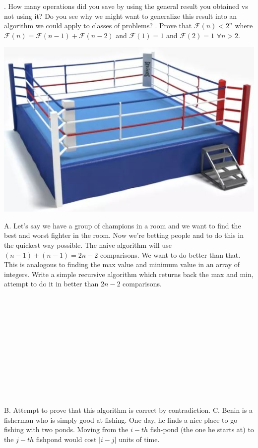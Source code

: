 \documentclass[12pt]{article}
\begin{document}
. How many operations did you save by using the general result you obtained vs not using it? Do you see why we might want to generalize this result into an algorithm we could apply to classes of problems?
\newpage
{}.  Prove that $\mathscr{F}(n) < 2^n$ where $\mathscr{F}(n) = \mathscr{F}(n-1) + \mathscr{F}(n-2)$ and $\mathscr{F}(1)=1$ and $\mathscr{F}(2) = 1$ $\forall n > 2$. 
\newpage
\centerline{\includegraphics[scale = 0.25]{boxing.jpg}}
\noindent A. Let's say we have a group of champions in a room and we want to find the best and worst fighter in the room. Now we're betting people and to do this in the quickest way possible. The naive algorithm will use $(n-1) + (n-1) = 2n -2 $ comparisons. We want to do better than that. This is analogous to finding the max value and minimum value in an array of integers. Write a simple recursive algorithm which returns back the max and min, attempt to do it in better than $2n-2$ comparisons.\\\\\\\\\\\\\\\\\\\\\\\\\\
\noindent B. Attempt to prove that this algorithm is correct by contradiction. 
\newpage
\noindent C. Benin is a fisherman who is simply good at fishing. One day, he finds a nice place to go fishing with two ponds. 
Moving from the $i-th$ fish-pond (the one he starts at) to the $j-th$ fishpond would cost $|i - j|$ units of time. 
\end{document}

